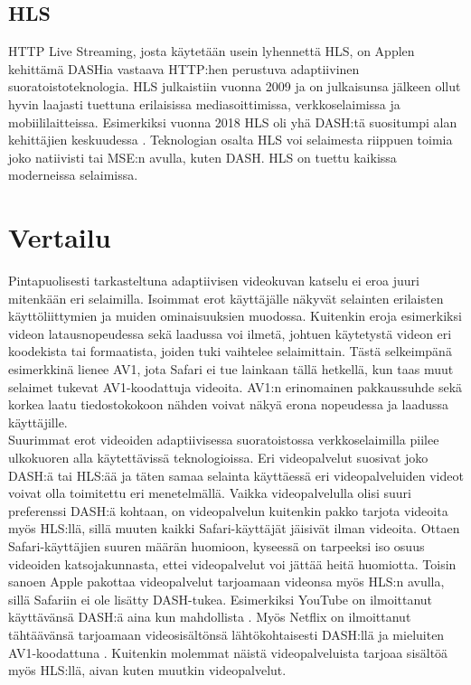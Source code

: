 \documentclass[finnish, 12pt, a4paper, elec, utf8, a-1b, online]{aaltothesis}
\begin{document}
\subsection*{HLS}

HTTP Live Streaming, josta käytetään usein lyhennettä HLS, on Applen kehittämä DASHia vastaava HTTP:hen perustuva adaptiivinen suoratoistoteknologia. HLS julkaistiin vuonna 2009 ja on julkaisunsa jälkeen ollut hyvin laajasti tuettuna erilaisissa mediasoittimissa, verkkoselaimissa ja mobiililaitteissa. Esimerkiksi vuonna 2018 HLS oli yhä DASH:tä suositumpi alan kehittäjien keskuudessa \cite{Bitmovin1}. Teknologian osalta HLS voi selaimesta riippuen toimia joko natiivisti tai MSE:n avulla, kuten DASH. HLS on tuettu kaikissa moderneissa selaimissa. \cite{Spiceworks}

\clearpage


\section{Vertailu}

Pintapuolisesti tarkasteltuna adaptiivisen videokuvan katselu ei eroa juuri mitenkään eri selaimilla. Isoimmat erot käyttäjälle näkyvät selainten erilaisten käyttöliittymien ja muiden ominaisuuksien muodossa. Kuitenkin eroja esimerkiksi videon latausnopeudessa sekä laadussa voi ilmetä, johtuen käytetystä videon eri koodekista tai formaatista, joiden tuki vaihtelee selaimittain. Tästä selkeimpänä esimerkkinä lienee AV1, jota Safari ei tue lainkaan tällä hetkellä, kun taas muut selaimet tukevat AV1-koodattuja videoita. AV1:n erinomainen pakkaussuhde sekä korkea laatu tiedostokokoon nähden voivat näkyä erona nopeudessa ja laadussa käyttäjille. \\

\noindent Suurimmat erot videoiden adaptiivisessa suoratoistossa verkkoselaimilla piilee ulkokuoren alla käytettävissä teknologioissa. Eri videopalvelut suosivat joko DASH:ä tai HLS:ää ja täten samaa selainta käyttäessä eri videopalveluiden videot voivat olla toimitettu eri menetelmällä. Vaikka videopalvelulla olisi suuri preferenssi DASH:ä kohtaan, on videopalvelun kuitenkin pakko tarjota videoita myös HLS:llä, sillä muuten kaikki Safari-käyttäjät jäisivät ilman videoita. Ottaen Safari-käyttäjien suuren määrän huomioon, kyseessä on tarpeeksi iso osuus videoiden katsojakunnasta, ettei videopalvelut voi jättää heitä huomiotta. Toisin sanoen Apple pakottaa videopalvelut tarjoamaan videonsa myös HLS:n avulla, sillä Safariin ei ole lisätty DASH-tukea. Esimerkiksi YouTube on ilmoittanut käyttävänsä DASH:ä aina kun mahdollista \cite{Bitmovin2}. Myös Netflix on ilmoittanut tähtäävänsä tarjoamaan videosisältönsä lähtökohtaisesti DASH:llä ja mieluiten AV1-koodattuna \cite{Netflix}. Kuitenkin molemmat näistä videopalveluista tarjoaa sisältöä myös HLS:llä, aivan kuten muutkin videopalvelut. \\
\end{document}
